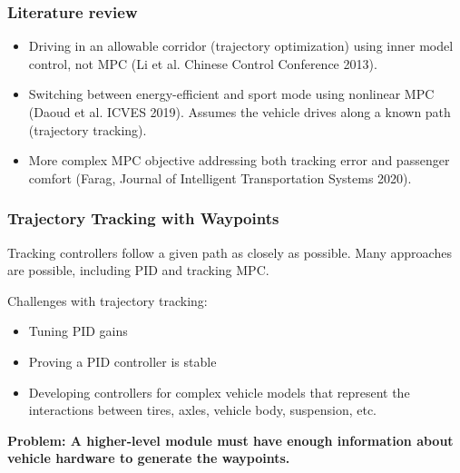 \documentclass{beamer}
\begin{document}
\begin{frame}
\frametitle{Literature review}
\begin{itemize}

\item Driving in an allowable corridor (trajectory optimization) using inner model control, not MPC (Li et al. Chinese Control Conference 2013).

\vspace{1em}



\item Switching between energy-efficient and sport mode using nonlinear MPC (Daoud et al. ICVES 2019). Assumes the vehicle drives along a known path (trajectory tracking).
\vspace{1em}
\item More complex MPC objective addressing both tracking error and passenger comfort (Farag, Journal of Intelligent Transportation Systems 2020).

\end{itemize}
\end{frame}

\begin{frame}
	\frametitle{Trajectory Tracking with Waypoints}
Tracking controllers follow a given path as closely as possible. Many approaches are possible, including PID and tracking MPC.

Challenges with trajectory tracking:
	\begin{itemize}
		\item Tuning PID gains
		\item Proving a PID controller is stable
		\item Developing controllers for complex vehicle models that represent the interactions between tires, axles, vehicle body, suspension, etc.
	\end{itemize}
\textbf{Problem: A higher-level module must have enough information about vehicle hardware to generate the waypoints.}
\end{frame}
	
\end{document}
